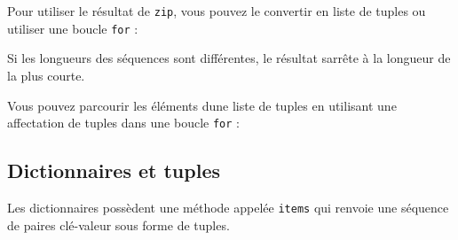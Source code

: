 Pour utiliser le résultat de \texttt{zip}, vous pouvez le convertir en
liste de tuples ou utiliser une boucle \texttt{for} :

\begin{Shaded}
\begin{Highlighting}[]
\OperatorTok{\textgreater{}\textgreater{}\textgreater{}} \NormalTok{(}
\NormalTok{[(}\NormalTok{, }\NormalTok{), (}\NormalTok{, }\NormalTok{), (}\NormalTok{, }\NormalTok{)]}
\end{Highlighting}
\end{Shaded}

Si les longueurs des séquences sont différentes, le résultat
s\textquotesingle arrête à la longueur de la plus courte.

Vous pouvez parcourir les éléments d\textquotesingle une liste de tuples
en utilisant une affectation de tuples dans une boucle \texttt{for} :

\begin{Shaded}
\begin{Highlighting}[]
\OperatorTok{=}\NormalTok{ [(}\NormalTok{, }\NormalTok{), (}\NormalTok{, }\NormalTok{), (}\NormalTok{, }\NormalTok{)]}
\end{Highlighting}
\end{Shaded}

\hypertarget{dictionnaires-et-tuples}{%
\subsection{Dictionnaires et tuples}\label{dictionnaires-et-tuples}}

Les dictionnaires possèdent une méthode appelée \texttt{items} qui
renvoie une séquence de paires clé-valeur sous forme de tuples.

